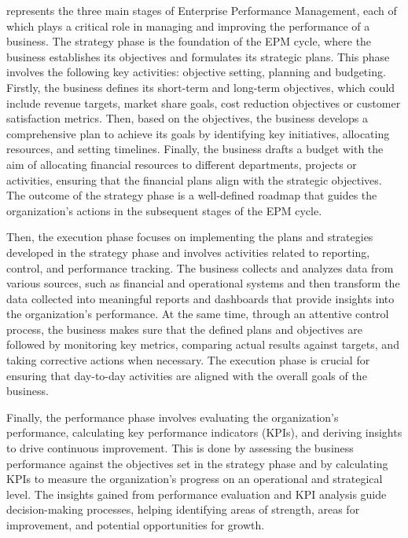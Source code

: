 \documentclass[12pt,a4paper,openright,twoside]{book}
\begin{document}
 represents the three main stages of Enterprise Performance Management, each of which plays a critical role in managing and improving the performance of a business. 
%
The strategy phase is the foundation of the EPM cycle, where the business establishes its objectives and formulates its strategic plans. 
%
This phase involves the following key activities: objective setting, planning and budgeting.
%
Firstly, the business defines its short-term and long-term objectives, which could include revenue targets, market share goals, cost reduction objectives or customer satisfaction metrics.
%
Then, based on the objectives, the business develops a comprehensive plan to achieve its goals by identifying key initiatives, allocating resources, and setting timelines.
%
Finally, the business drafts a budget with the aim of allocating financial resources to different departments, projects or activities, ensuring that the financial plans align with the strategic objectives.
%
The outcome of the strategy phase is a well-defined roadmap that guides the organization's actions in the subsequent stages of the EPM cycle.

Then, the execution phase focuses on implementing the plans and strategies developed in the strategy phase and involves activities related to reporting, control, and performance tracking.
%
The business collects and analyzes data from various sources, such as financial and operational systems and then transform the data collected into meaningful reports and dashboards that provide insights into the organization's performance.
%
At the same time, through an attentive control process, the business makes sure that the defined plans and objectives are followed by monitoring key metrics, comparing actual results against targets, and taking corrective actions when necessary.
%
The execution phase is crucial for ensuring that day-to-day activities are aligned with the overall goals of the business.

Finally, the performance phase involves evaluating the organization's performance, calculating key performance indicators (KPIs), and deriving insights to drive continuous improvement. 
%
This is done by assessing the business performance against the objectives set in the strategy phase and by calculating KPIs to measure the organization's progress on an operational and strategical level.
%
The insights gained from performance evaluation and KPI analysis guide decision-making processes, helping identifying areas of strength, areas for improvement, and potential opportunities for growth.
\end{document}
